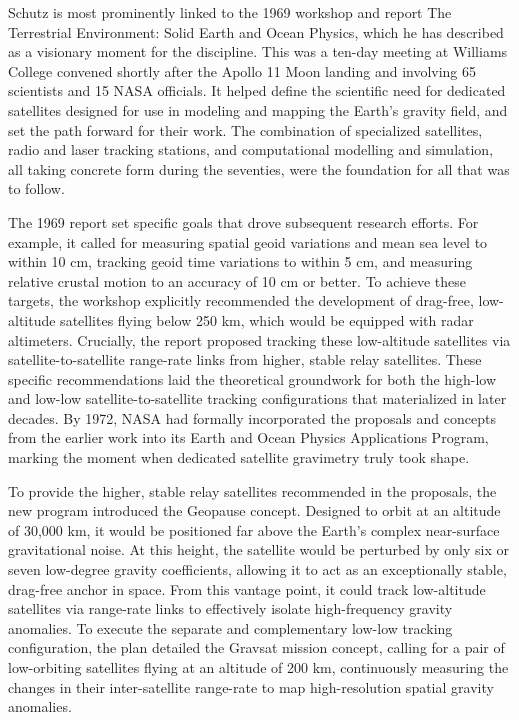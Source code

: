 Schutz is most prominently linked to the 1969 workshop and report The Terrestrial Environment: Solid Earth and Ocean Physics, which he has described as a visionary moment for the discipline. This was a ten-day meeting at Williams College convened shortly after the Apollo 11 Moon landing and involving 65 scientists and 15 NASA officials. It helped define the scientific need for dedicated satellites designed for use in modeling and mapping the Earth's gravity field, and set the path forward for their work. The combination of specialized satellites, radio and laser tracking stations, and computational modelling and simulation, all taking concrete form during the seventies, were the foundation for all that was to follow. \cite{kaulaTerrestrialEnvironmentSolidearth1970}

The 1969 report set specific goals that drove subsequent research efforts. For example, it called for measuring spatial geoid variations and mean sea level to within 10 cm, tracking geoid time variations to within 5 cm, and measuring relative crustal motion to an accuracy of 10 cm or better. To achieve these targets, the workshop explicitly recommended the development of drag-free, low-altitude satellites flying below 250 km, which would be equipped with radar altimeters. Crucially, the report proposed tracking these low-altitude satellites via satellite-to-satellite range-rate links from higher, stable relay satellites. These specific recommendations laid the theoretical groundwork for both the high-low and low-low satellite-to-satellite tracking configurations that materialized in later decades. By 1972, NASA had formally incorporated the proposals and concepts from the earlier work into its Earth and Ocean Physics Applications Program, marking the moment when dedicated satellite gravimetry truly took shape. \cite{pearlmanEarthOceanPhysics1972}

To provide the higher, stable relay satellites recommended in the proposals, the new program introduced the Geopause concept. Designed to orbit at an altitude of 30,000 km, it would be positioned far above the Earth's complex near-surface gravitational noise. At this height, the satellite would be perturbed by only six or seven low-degree gravity coefficients, allowing it to act as an exceptionally stable, drag-free anchor in space. From this vantage point, it could track low-altitude satellites via range-rate links to effectively isolate high-frequency gravity anomalies. To execute the separate and complementary low-low tracking configuration, the plan detailed the Gravsat mission concept, calling for a pair of low-orbiting satellites flying at an altitude of 200 km, continuously measuring the changes in their inter-satellite range-rate to map high-resolution spatial gravity anomalies.

